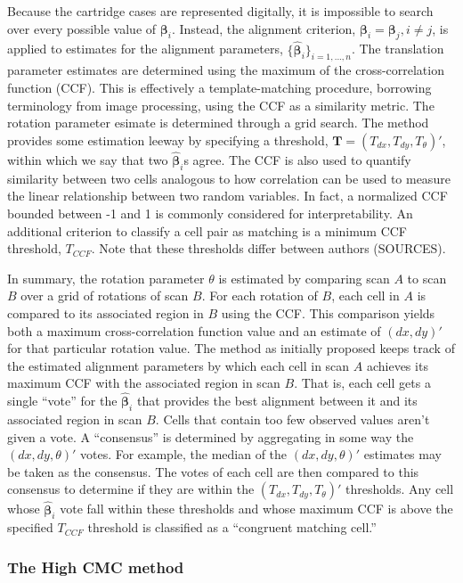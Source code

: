 Because the cartridge cases are represented digitally, it is impossible
to search over every possible value of \(\pmb{\beta}_i\). Instead, the
alignment criterion, \(\pmb{\beta}_i = \pmb{\beta}_j, i \neq j\), is
applied to estimates for the alignment parameters,
\(\{\hat{\pmb{\beta}}_i\}_{i = 1,...,n}\). The translation parameter
estimates are determined using the maximum of the cross-correlation
function (CCF). This is effectively a template-matching procedure,
borrowing terminology from image processing, using the CCF as a
similarity metric. The rotation parameter esimate is determined through
a grid search. The method provides some estimation leeway by specifying
a threshold, \(\pmb{T} = (T_{dx}, T_{dy}, T_\theta)'\), within which we
say that two \(\hat{\pmb{\beta}}_i\)s agree. The CCF is also used to
quantify similarity between two cells analogous to how correlation can
be used to measure the linear relationship between two random variables.
In fact, a normalized CCF bounded between -1 and 1 is commonly
considered for interpretability. An additional criterion to classify a
cell pair as matching is a minimum CCF threshold, \(T_{CCF}\). Note that
these thresholds differ between authors (SOURCES).

In summary, the rotation parameter \(\theta\) is estimated by comparing
scan \(A\) to scan \(B\) over a grid of rotations of scan \(B\). For
each rotation of \(B\), each cell in \(A\) is compared to its associated
region in \(B\) using the CCF. This comparison yields both a maximum
cross-correlation function value and an estimate of \((dx,dy)'\) for
that particular rotation value. The method as initially proposed keeps
track of the estimated alignment parameters by which each cell in scan
\(A\) achieves its maximum CCF with the associated region in scan \(B\).
That is, each cell gets a single ``vote'' for the
\(\hat{\pmb{\beta}}_i\) that provides the best alignment between it and
its associated region in scan \(B\). Cells that contain too few observed
values aren't given a vote. A ``consensus'' is determined by aggregating
in some way the \((dx,dy,\theta)'\) votes. For example, the median of
the \((dx,dy,\theta)'\) estimates may be taken as the consensus. The
votes of each cell are then compared to this consensus to determine if
they are within the \((T_{dx}, T_{dy}, T_\theta)'\) thresholds. Any cell
whose \(\hat{\pmb{\beta}}_i\) vote fall within these thresholds and
whose maximum CCF is above the specified \(T_{CCF}\) threshold is
classified as a ``congruent matching cell.''

\hypertarget{highCMCMethod}{%
\subsubsection{The High CMC method}\label{highCMCMethod}}

